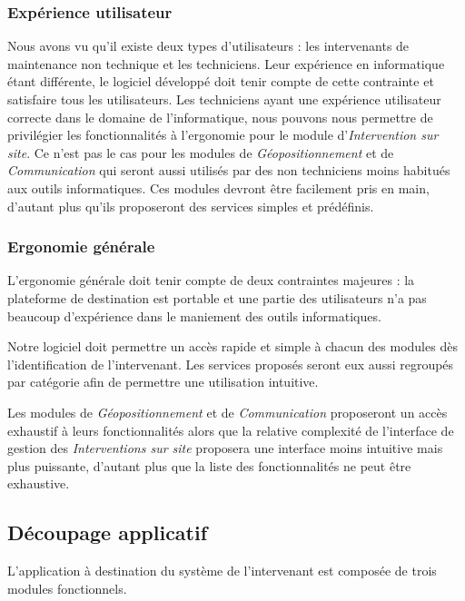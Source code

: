 \documentclass[a4paper, 11pt, final]{article}
\begin{document}
\subsubsection{Expérience utilisateur}
Nous avons vu qu'il existe deux types d'utilisateurs : les intervenants de maintenance non technique et les techniciens. Leur expérience en informatique étant différente, le logiciel développé doit tenir compte de cette contrainte et satisfaire tous les utilisateurs. Les techniciens ayant une expérience utilisateur correcte dans le domaine de l'informatique, nous pouvons nous permettre de privilégier les fonctionnalités à l'ergonomie pour le module d'\emph{Intervention sur site}. Ce n'est pas le cas pour les modules de \emph{Géopositionnement} et de \emph{Communication} qui seront aussi utilisés par des non techniciens moins habitués aux outils informatiques. Ces modules devront être facilement pris en main, d'autant plus qu'ils proposeront des services simples et prédéfinis.

\subsubsection{Ergonomie générale}
L'ergonomie générale doit tenir compte de deux contraintes majeures : la plateforme de destination est portable et une partie des utilisateurs n'a pas beaucoup d'expérience dans le maniement des outils informatiques.

Notre logiciel doit permettre un accès rapide et simple à chacun des modules dès l'identification de l'intervenant. Les services proposés seront eux aussi regroupés par catégorie afin de permettre une utilisation intuitive.

Les modules de \emph{Géopositionnement} et de \emph{Communication} proposeront un accès exhaustif à leurs fonctionnalités alors que la relative complexité de l'interface de gestion des \emph{Interventions sur site} proposera une interface moins intuitive mais plus puissante, d'autant plus que la liste des fonctionnalités ne peut être exhaustive.

\subsection{Découpage applicatif}

L'application à destination du système de l'intervenant est composée de trois modules fonctionnels.
\end{document}
